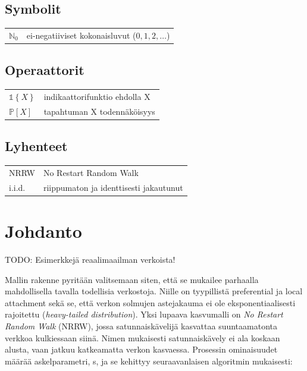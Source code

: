 \documentclass[finnish, 12pt, a4paper, sci, utf8, pdfa]{aaltothesis}
\newcommand{\N}{\mathbb{N}}
\newcommand{\indicator}{\mathopen{\mathds{1}}}
\newcommand*{\prob}{\mathbb{P}}
\begin{document}
\thesistableofcontents



\subsection*{Symbolit}

\begin{tabular}{ll}
$\N_{0}$  & ei-negatiiviset kokonaisluvut (\( 0, 1, 2, \ldots \))  \\
\end{tabular}

\subsection*{Operaattorit}

\begin{tabular}{ll}
   $ \indicator \left\{ X \right\} $               & indikaattorifunktio ehdolla X\\
   $ \prob \left[ X \right] $                      & tapahtuman X todennäköisyys\\
\end{tabular}

\subsection*{Lyhenteet}

\begin{tabular}{ll}
NRRW       & No Restart Random Walk\\
i.i.d.     & riippumaton ja identtisesti jakautunut\\
\end{tabular}


\cleardoublepage

\section{Johdanto}

\thispagestyle{empty}

TODO: Esimerkkejä reaalimaailman verkoista!

Mallin rakenne pyritään valitsemaan siten, että se mukailee parhaalla mahdollisella tavalla todellisia verkostoja. Niille on tyypillistä preferential ja local attachment sekä se, että verkon solmujen astejakauma ei ole eksponentiaalisesti rajoitettu (\textit{heavy-tailed distribution}). 
Yksi lupaava kasvumalli on \textit{No Restart Random Walk} (NRRW), jossa satunnaiskävelijä kasvattaa suuntaamatonta verkkoa kulkiessaan siinä. Nimen mukaisesti satunnaiskävely ei ala koskaan alusta, vaan jatkuu katkeamatta verkon kasvaessa. Prosessin ominaisuudet määrää askelparametri, s, ja se kehittyy seuraavanlaisen algoritmin mukaisesti:
\end{document}
